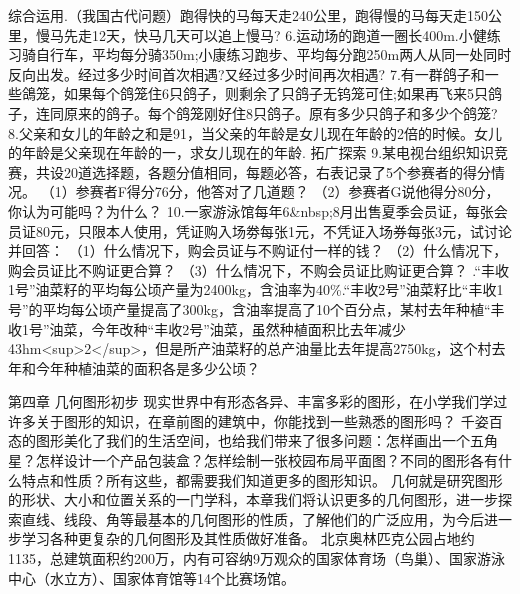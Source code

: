 \beginexercise
综合运用.（我国古代问题）跑得快的马每天走240公里，跑得慢的马每天走150公里，慢马先走12天，快马几天可以追上慢马?\newline
 6.运动场的跑道一圈长400m.小健练习骑自行车，平均每分骑350m;小康练习跑步、平均每分跑250m两人从同一处同时反向出发。经过多少时间首次相遇?又经过多少时间再次相遇?    \newline 7.有一群鸽子和一些鴿笼，如果每个鸽笼住6只鸽子，则剩余了只鸽子无钨笼可住;如果再飞来5只鸽子，连同原来的鸽子。每个鸽笼刚好住8只鸽子。原有多少只鸽子和多少个鸽笼?   \newline  8.父亲和女儿的年龄之和是91，当父亲的年龄是女儿现在年龄的2倍的时候。女儿的年龄是父亲现在年龄的一，求女儿现在的年龄.\newline
 拓广探索   \newline
 9.某电视台组织知识竞赛，共设20道选择题，各题分值相同，每题必答，右表记录了5个参赛者的得分情况。 \newline
 （1）参赛者F得分76分，他答对了几道题？ \newline
 （2）参赛者G说他得分80分，你认为可能吗？为什么？ \newline
 10.一家游泳馆每年6&nbsp;8月出售夏季会员证，每张会员证80元，只限本人使用，凭证购入场劵每张1元，不凭证入场券每张3元，试讨论并回答： \newline
 （1）什么情况下，购会员证与不购证付一样的钱？ \newline
 （2）什么情况下，购会员证比不购证更合算？ \newline
 （3）什么情况下，不购会员证比购证更合算？ .“丰收1号”油菜籽的平均每公顷产量为2400kg，含油率为40\%.“丰收2号”油菜籽比“丰收1号”的平均每公顷产量提高了300kg，含油率提高了10个百分点，某村去年种植“丰收1号”油菜，今年改种“丰收2号”油菜，虽然种植面积比去年减少43hm<sup>2</sup>，但是所产油菜籽的总产油量比去年提高2750kg，这个村去年和今年种植油菜的面积各是多少公顷？ \newline
\endexercise

\beginarticle
第四章 几何图形初步\newline
现实世界中有形态各异、丰富多彩的图形，在小学我们学过许多关于图形的知识，在章前图的建筑中，你能找到一些熟悉的图形吗？\newline
千姿百态的图形美化了我们的生活空间，也给我们带来了很多问题：怎样画出一个五角星？怎样设计一个产品包装盒？怎样绘制一张校园布局平面图？不同的图形各有什么特点和性质？所有这些，都需要我们知道更多的图形知识。\newline
几何就是研究图形的形状、大小和位置关系的一门学科，本章我们将认识更多的几何图形，进一步探索直线、线段、角等最基本的几何图形的性质，了解他们的广泛应用，为今后进一步学习各种更复杂的几何图形及其性质做好准备。\newline
北京奥林匹克公园占地约1135，总建筑面积约200万，内有可容纳9万观众的国家体育场（鸟巢）、国家游泳中心（水立方）、国家体育馆等14个比赛场馆。\newline
\endarticle


